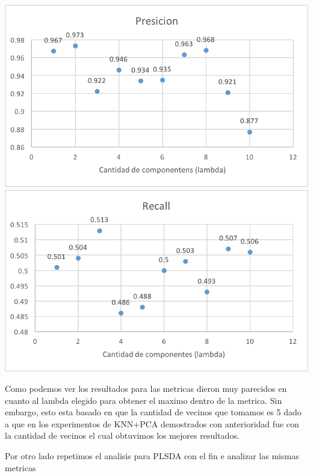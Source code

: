 \includegraphics[scale=1]{imagenes/pcaPresicion.png}\\
\includegraphics[scale=1]{imagenes/pcaRecall.png}

Como podemos ver los resultados para las metricas dieron muy parecidos en cuanto al lambda elegido para obtener el maximo dentro de la metrica. Sin embargo, esto esta basado en que la cantidad de vecinos que tomamos es 5 dado a que en los experimentos de KNN+PCA demostrados con anterioridad fue con la cantidad de vecinos el cual obtuvimos los mejores resultados.

Por otro lado repetimos el analisis para PLSDA con el fin e analizar las mismas metricas

